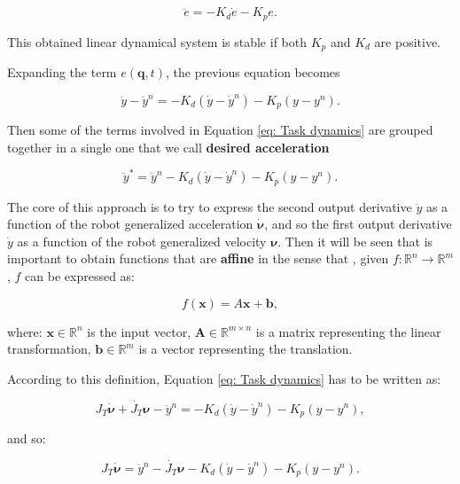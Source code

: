 \begin{equation*}
    \ddot{e} = -K_d\dot{e} -K_pe.
\end{equation*}

This obtained linear dynamical system is stable if both $K_p$ and $K_d$ are positive.

Expanding the term $e(\mathbf{q},t)$, the previous equation becomes

\begin{equation}
    \ddot{y} - \ddot{y}^{n}  = -K_d(\dot{y}-\dot{y}^{n}) -K_p(y - y^{n}).
    \label{eq: Task dynamics}
\end{equation}

Then some of the terms involved in Equation \eqref{eq: Task dynamics} are grouped together in a single one that we call \textbf{desired acceleration}

\begin{equation}
    \ddot{y}^{*} = \ddot{y}^{n} -K_d(\dot{y}-\dot{y}^{n}) -K_p(y - y^{n}).
    \label{eq: Desired Acceleration}
\end{equation}

The core of this approach is to try to express the second output derivative $\ddot{y}$ as a function of the robot generalized acceleration $\dot{\bm{\nu}}$, and so the first output derivative $\dot{y}$ as a function of the robot generalized velocity $\bm{\nu}$.
Then it will be seen that is important to obtain functions that are \textbf{affine} in the sense that \cite{boyd2004convex}, given $f: \mathbb{R}^n \to \mathbb{R}^m$, $f$ can be expressed as:

\begin{equation*}
    f(\mathbf{x}) = A\mathbf{x} + \mathbf{b},
\end{equation*}

where: $\mathbf{x} \in \mathbb{R}^n$ is the input vector, $\mathbf{A} \in \mathbb{R}^{m \times n}$ is a matrix representing the linear transformation, $\mathbf{b} \in \mathbb{R}^m$ is a vector representing the translation.

According to this definition, Equation \eqref{eq: Task dynamics} has to be written as:

\begin{equation*}
        J_{T}\dot{\bm{\nu}} + \dot{J_{T}}\bm{\nu} - \ddot{y}^{n} = -K_d(\dot{y}-\dot{y}^{n}) -K_p(y - y^{n}) ,
\end{equation*}

and so:

\begin{equation}
        J_{T}\dot{\bm{\nu}} = \ddot{y}^{n} - \dot{J_{T}}\bm{\nu} - K_d(\dot{y}-\dot{y}^{n}) - K_p(y - y^{n}).
        \label{eq: Task equation with Jacobians}
\end{equation}

